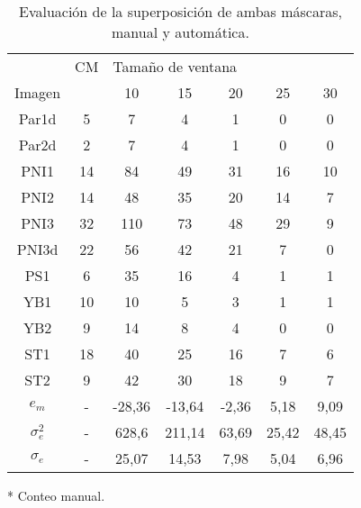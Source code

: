 \begin{table}[]
    \centering
    \begin{threeparttable}[b]
        \label{tab:homomorfico}
        \caption{Evaluación de la superposición de ambas máscaras, manual y automática.}
        
        \begin{tabular}{ccccccc}
        \hline
        \hline
                  & CM \tnote{*}  & \multicolumn{5}{l}{Tamaño de ventana}   \\
            Imagen&   & 10     & 15     & 20    & 25    & 30    \\ \hline
            Par1d & 5  & 7      & 4      & 1     & 0     & 0     \\
            Par2d & 2  & 7      & 4      & 1     & 0     & 0     \\
            PNI1  & 14 & 84     & 49     & 31    & 16    & 10    \\
            PNI2  & 14 & 48     & 35     & 20    & 14    & 7     \\
            PNI3  & 32 & 110    & 73     & 48    & 29    & 9     \\
            PNI3d & 22 & 56     & 42     & 21    & 7     & 0     \\
            PS1   & 6  & 35     & 16     & 4     & 1     & 1     \\
            YB1   & 10 & 10     & 5      & 3     & 1     & 1     \\
            YB2   & 9  & 14     & 8      & 4     & 0     & 0     \\
            ST1   & 18 & 40     & 25     & 16    & 7     & 6     \\
            ST2   & 9  & 42     & 30     & 18    & 9     & 7     \\ \hline
            $e_{m}$    & -  & -28,36 & -13,64 & -2,36 & 5,18  & 9,09  \\
            $\sigma^2_{e}$   & -  & 628,6  & 211,14 & 63,69 & 25,42 & 48,45 \\
            $\sigma_{e}$    & -  & 25,07  & 14,53  & 7,98  & 5,04  & 6,96  \\ \hline \hline
        \end{tabular}
        \begin{tablenotes}
                \item [*]Conteo manual.
        \end{tablenotes}
  \end{threeparttable}
\end{table}
       